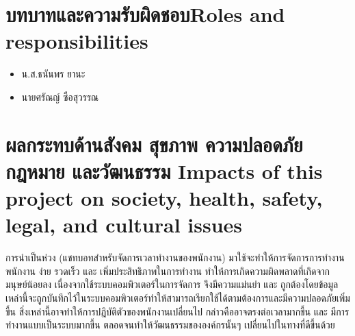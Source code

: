 \section{\ifcpe บทบาทและความรับผิดชอบ\else Roles and responsibilities\fi}
\begin{itemize}
    \item น.ส.ธนันพร ยานะ
    \item นายศรัณญ์ ซือสุวรรณ
\end{itemize}

\section{\ifcpe%
ผลกระทบด้านสังคม สุขภาพ ความปลอดภัย กฎหมาย และวัฒนธรรม
\else%
Impacts of this project on society, health, safety, legal, and cultural issues
\fi}
การนำเป็นห่วง (แชทบอทสำหรับจัดการเวลาทำงานของพนักงาน) 
มาใช้จะทำให้การจัดการการทำงานพนักงาน ง่าย รวดเร็ว และ เพิ่มประสิทธิภาพในการทำงาน 
ทำให้การเกิดความผิดพลาดที่เกิดจากมนุษย์น้อยลง เนื่องจากใช้ระบบคอมพิวเตอร์ในการจัดการ 
จึงมีความแม่นยำ และ ถูกต้องโดยข้อมูลเหล่านี้จะถูกบันทึกไว้ในระบบคอมพิวเตอร์ทำให้สามารถเรียกใช้ได้ตามต้องการและมีความปลอดภัยเพิ่มขึ้น 
สิ่งเหล่านี้อาจทำให้การปฎิบัติตัวของพนักงานเปลี่ยนไป กล่าวคืออาจตรงต่อเวลามากขึ้น และ 
มีการทำงานแบบเป็นระบบมากขึ้น ตลอดจนทำให้วัฒนธรรมขององค์กรนั้นๆ เปลี่ยนไปในทางที่ดีขึ้นด้วย